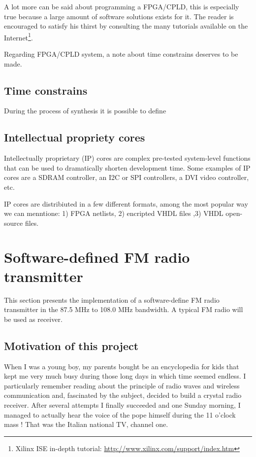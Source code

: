 \documentclass[13pt]{extreport}
\begin{document}
A lot more can be said about programming a FPGA/CPLD, this is especially true because a large amount of software solutions exists for it. The reader is encouraged to satisfy his thirst by consulting the many tutorials available on the Internet\footnote{Xilinx ISE in-depth tutorial: \scriptsize\url{http://www.xilinx.com/support/index.htm}}.

Regarding FPGA/CPLD system, a note about time constrains deserves to be made.

\subsection{Time constrains}
During the process of synthesis it is possible to define

\subsection{Intellectual propriety cores}
Intellectually proprietary (IP) cores are complex pre-tested system-level functions that can be used to dramatically shorten development time. Some examples of IP cores are a SDRAM controller, an I2C or SPI controllers, a DVI video controller, etc.

IP cores are distribiuted in a few different formats, among the most popular way we can menntione: 1) FPGA netlists, 2) encripted VHDL files ,3) VHDL open-source files.

\section{Software-defined FM radio transmitter}
This section presents the implementation of a software-define FM radio transmitter in the 87.5 MHz to 108.0 MHz bandwidth. A typical FM radio will be used as receiver.

\subsection{Motivation of this project}
When I was a young boy, my parents bought be an encyclopedia for kids that kept me very much busy during those long days in which time seemed endless. I particularly remember reading about the principle of radio waves and wireless communication and, fascinated by the subject, decided to build a crystal radio receiver. After several attempts I finally succeeded and one Sunday morning, I managed to actually hear the voice of the pope himself during the 11 o'clock mass ! That was the Italian national TV, channel one.
\end{document}
